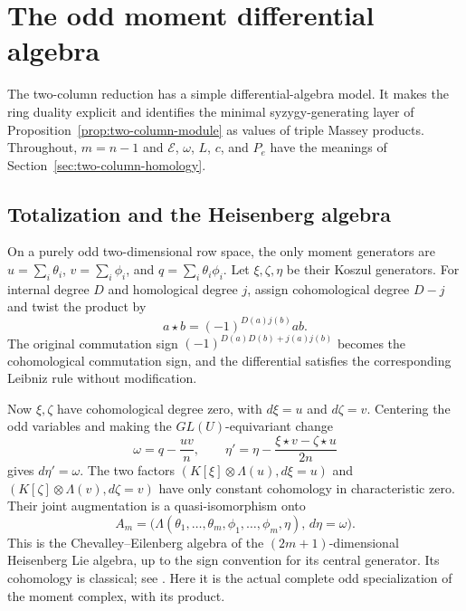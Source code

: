 \section{The odd moment differential algebra}
\label{app:odd-derived}

The two-column reduction has a simple differential-algebra model.
It makes the ring duality explicit and identifies the minimal
syzygy-generating layer of Proposition~\ref{prop:two-column-module}
as values of triple Massey products. Throughout, $m=n-1$ and
$\mathcal E$, $\omega$, $L$, $c$, and $P_e$ have the meanings of
Section~\ref{sec:two-column-homology}.

\subsection{Totalization and the Heisenberg algebra}

On a purely odd two-dimensional row space, the only moment generators
are
$u=\sum_i\theta_i$, $v=\sum_i\phi_i$, and
$q=\sum_i\theta_i\phi_i$.
Let $\xi,\zeta,\eta$ be their Koszul generators. For internal degree
$D$ and homological degree $j$, assign cohomological degree $D-j$
and twist the product by
\begin{equation}\label{eq:odd-totalization}
                       a\star b=(-1)^{D(a)j(b)}ab.
\end{equation}
The original commutation sign
$(-1)^{D(a)D(b)+j(a)j(b)}$ becomes the cohomological commutation
sign, and the differential satisfies the corresponding Leibniz rule
without modification.

Now $\xi,\zeta$ have cohomological degree zero, with
$d\xi=u$ and $d\zeta=v$. Centering the odd variables and making the
$GL(U)$-equivariant change
\[
 \omega=q-\frac{uv}{n},\qquad
 \eta'=\eta-\frac{\xi\star v-\zeta\star u}{2n}
\]
gives $d\eta'=\omega$. The two factors
$(K[\xi]\otimes\Lambda(u),d\xi=u)$ and
$(K[\zeta]\otimes\Lambda(v),d\zeta=v)$ have only constant cohomology
in characteristic zero. Their joint augmentation is a
quasi-isomorphism onto
\begin{equation}\label{eq:odd-heisenberg-model}
 A_m=\bigl(\Lambda(\theta_1,\ldots,\theta_m,
                  \phi_1,\ldots,\phi_m,\eta),\,d\eta=\omega\bigr).
\end{equation}
This is the Chevalley--Eilenberg algebra of the $(2m+1)$-dimensional
Heisenberg Lie algebra, up to the sign convention for its central
generator. Its cohomology is classical; see \cite{CairnsJambor}.
Here it is the actual complete odd specialization of the moment
complex, with its product.


